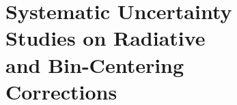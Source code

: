 \documentclass[aps, prl]{revtex4-2}  %
\begin{document}
\begin{figure}[!h]
\begin{figure}[!h]
\section{\large Systematic Uncertainty Studies on Radiative and Bin-Centering Corrections }

\end{figure}
\end{figure}
\end{document}
